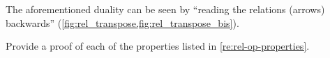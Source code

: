 \begin{remark}
    The aforementioned duality can be seen by ``reading the relations (arrows) backwards'' (\cref{fig:rel_transpose,fig:rel_transpose_bis}).
\end{remark}

\vfill
\begin{gradedexercise}
    \label{ex:RelProperties}
    Provide a proof of each of the properties listed in \cref{re:rel-op-properties}.
\end{gradedexercise}

